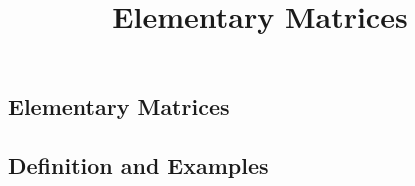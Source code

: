 \documentclass{ximera}
\title{Elementary Matrices} \license{CC BY-NC-SA 4.0}
\begin{document}
\begin{abstract}

\end{abstract}
\maketitle

\begin{onlineOnly}
\section*{Elementary Matrices}
\end{onlineOnly}

\subsection*{Definition and Examples}
\end{document}
